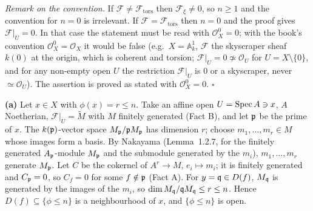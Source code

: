 \documentclass[11pt]{article}
\begin{document}
\emph{Remark on the convention.} If $\mathcal F\neq\mathcal F_{\operatorname{tors}}$ then $\mathcal F_\xi\neq0$, so $n\ge1$ and the convention for $n=0$ is irrelevant. If $\mathcal F=\mathcal F_{\operatorname{tors}}$ then $n=0$ and the proof gives $\mathcal F|_U=0$. In that case the statement must be read with $\mathcal O_X^0=0$; with the book's convention $\mathcal O_X^0=\mathcal O_X$ it would be false (e.g.\ $X=\mathbb A^1_k$, $\mathcal F$ the skyscraper sheaf $k(0)$ at the origin, which is coherent and torsion; $\mathcal F|_U=0\not\simeq\mathcal O_U$ for $U=X\setminus\{0\}$, and for any non-empty open $U$ the restriction $\mathcal F|_U$ is $0$ or a skyscraper, never $\simeq\mathcal O_U$). The assertion is proved as stated with $\mathcal O_X^0=0$. \hfill$\square$

\pf
\textbf{(a)} Let $x\in X$ with $\phi(x)=r\le n$. Take an affine open $U=\operatorname{Spec} A\ni x$, $A$ Noetherian, $\mathcal F|_U=\widetilde M$ with $M$ finitely generated (Fact B), and let $\mathfrak p$ be the prime of $x$. The $k(\mathfrak p)$-vector space $M_\mathfrak p/\mathfrak p M_\mathfrak p$ has dimension $r$; choose $m_1,\dots,m_r\in M$ whose images form a basis. By Nakayama (Lemma~1.2.7, for the finitely generated $A_\mathfrak p$-module $M_\mathfrak p$ and the submodule generated by the $m_i$), $m_1,\dots,m_r$ generate $M_\mathfrak p$. Let $C$ be the cokernel of $A^r\to M$, $e_i\mapsto m_i$; it is finitely generated and $C_\mathfrak p=0$, so $C_f=0$ for some $f\notin\mathfrak p$ (Fact A). For $y=\mathfrak q\in D(f)$, $M_\mathfrak q$ is generated by the images of the $m_i$, so $\dim M_\mathfrak q/\mathfrak q M_\mathfrak q\le r\le n$. Hence $D(f)\subseteq\{\phi\le n\}$ is a neighbourhood of $x$, and $\{\phi\le n\}$ is open.
\end{document}
